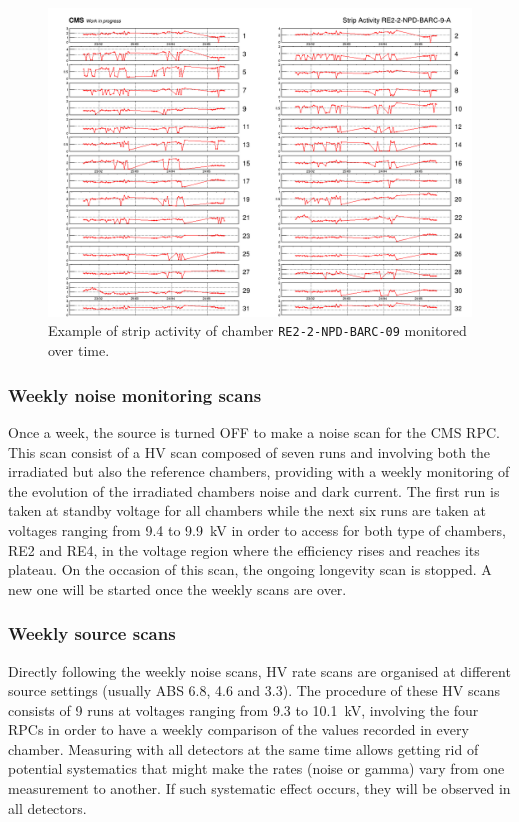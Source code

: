 	\begin{figure}[H]
        \centering
		\includegraphics[width = \linewidth]{fig/chapt5/GIFpp-Strip-Activity.png}
		\caption{\label{fig:stripactivity} Example of strip activity of chamber \texttt{RE2-2-NPD-BARC-09} monitored over time.}
	\end{figure}
	
		\subsubsection{Weekly noise monitoring scans}
		\label{chapt5:sssec:noisescan}
		
	Once a week, the source is turned OFF to make a noise scan for the CMS RPC. This scan consist of a HV scan composed of seven runs and involving both the irradiated but also the reference chambers, providing with a weekly monitoring of the evolution of the irradiated chambers noise and dark current. The first run is taken at standby voltage for all chambers while the next six runs are taken at voltages ranging from 9.4 to \SI{9.9}{kV} in order to access for both type of chambers, RE2 and RE4, in the voltage region where the efficiency rises and reaches its plateau. On the occasion of this scan, the ongoing longevity scan is stopped. A new one will be started once the weekly scans are over.
	
		\subsubsection{Weekly source scans}
		\label{chapt5:sssec:sourcescan}
		
	Directly following the weekly noise scans, HV rate scans are organised at different source settings (usually ABS 6.8, 4.6 and 3.3). The procedure of these HV scans consists of 9 runs at voltages ranging from 9.3 to \SI{10.1}{kV}, involving the four RPCs in order to have a weekly comparison of the values recorded in every chamber. Measuring with all detectors at the same time allows getting rid of potential systematics that might make the rates (noise or gamma) vary from one measurement to another. If such systematic effect occurs, they will be observed in all detectors.
	
